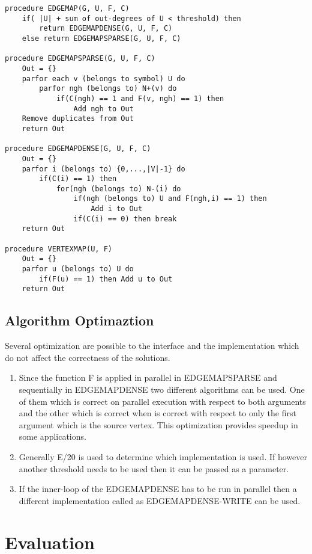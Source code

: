 \documentclass[a4paper,10pt,twoside]{article}
\begin{document}
\begin{lstlisting}
procedure EDGEMAP(G, U, F, C)
	if( |U| + sum of out-degrees of U < threshold) then
		return EDGEMAPDENSE(G, U, F, C)
	else return EDGEMAPSPARSE(G, U, F, C)

procedure EDGEMAPSPARSE(G, U, F, C)
	Out = {}
	parfor each v (belongs to symbol) U do
		parfor ngh (belongs to) N+(v) do
			if(C(ngh) == 1 and F(v, ngh) == 1) then
				Add ngh to Out
	Remove duplicates from Out
	return Out

procedure EDGEMAPDENSE(G, U, F, C)
	Out = {}
	parfor i (belongs to) {0,...,|V|-1} do
		if(C(i) == 1) then
			for(ngh (belongs to) N-(i) do
				if(ngh (belongs to) U and F(ngh,i) == 1) then
					Add i to Out
				if(C(i) == 0) then break
	return Out

procedure VERTEXMAP(U, F)
	Out = {}
	parfor u (belongs to) U do
		if(F(u) == 1) then Add u to Out
	return Out

\end{lstlisting}

\subsection{Algorithm Optimaztion}

Several optimization are possible to the interface and the implementation which do not affect the correctness of the solutions.
\begin{enumerate}
\item Since the function F is applied in parallel in EDGEMAPSPARSE and sequentially in EDGEMAPDENSE two different algorithms can be used. One of them which is correct on parallel execution with respect to both arguments and the other which is correct when is correct with respect to only the first argument which is the source vertex. This optimization provides speedup in some applications.
\item Generally \textbar E\textbar/20  is used to determine which implementation is used. If however another threshold needs to be used then it can be passed as a parameter.
\item If the inner-loop of the EDGEMAPDENSE has to be run in parallel then a different implementation called as EDGEMAPDENSE-WRITE can be used.
\end{enumerate}

\section{Evaluation}
\end{document}
